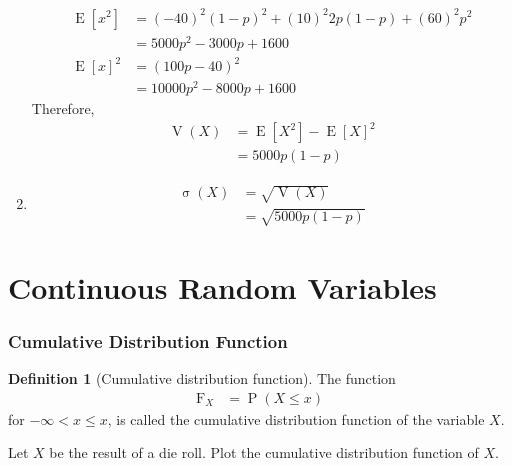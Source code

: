 \documentclass[titlepage, fleqn, a4paper, 12pt, twoside]{article}
\theoremstyle{definition}
\newtheorem{definition}{Definition}
\theoremstyle{theorem}
\DeclareMathOperator{\prob}{\mathrm{P}}
\DeclareMathOperator{\expct}{\mathrm{E}}
\DeclareMathOperator{\var}{\mathrm{V}}
\DeclareMathOperator{\sd}{\mathrm{\sigma}}
\newcommand*{\cdf}[1]{\mathrm{F}_{#1}}
\begin{document}
\begin{solution}
\begin{enumerate}[leftmargin=*]
\begin{align*}
				\expct\left[ x^2 \right] & = (-40)^2 (1 - p)^2 + (10)^2 2 p (1 - p) + (60)^2 p^2 \\
                                                         & = 5000 p^2 - 3000 p + 1600                            \\
				\expct[x]^2              & = (100 p - 40)^2                                      \\
                                                         & = 10000 p^2 - 8000 p + 1600
			\end{align*}
			Therefore,
			\begin{align*}
				\var(X) & = \expct\left[ X^2 \right] - \expct[X]^2 \\
                                        & = 5000 p (1 - p)
			\end{align*}
		\item
			\begin{align*}
				\sd(X) & = \sqrt{\var(X)} \\
                                       & = \sqrt{5000 p (1 - p)}
			\end{align*}
	\end{enumerate}
\end{solution}

\clearpage
\part{Continuous Random Variables}

\section{Cumulative Distribution Function}

\begin{definition}[Cumulative distribution function]
	The function
	\begin{align*}
		\cdf{X} & = \prob(X \le x)
	\end{align*}
	for $-\infty < x \le x$, is called the cumulative distribution function of the variable $X$.
\end{definition}

\begin{question}
	Let $X$ be the result of a die roll.
	Plot the cumulative distribution function of $X$.
\end{question}
\end{document}
